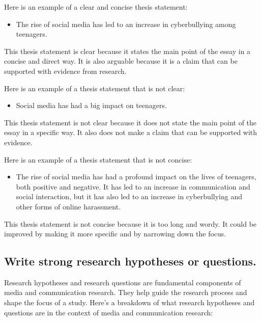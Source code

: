 \documentclass[
]{book}
\providecommand{\tightlist}{%
  \setlength{\itemsep}{0pt}\setlength{\parskip}{0pt}}
\begin{document}
Here is an example of a clear and concise thesis statement:

\begin{itemize}
\tightlist
\item
  The rise of social media has led to an increase in cyberbullying among teenagers.
\end{itemize}

This thesis statement is clear because it states the main point of the essay in a concise and direct way. It is also arguable because it is a claim that can be supported with evidence from research.

Here is an example of a thesis statement that is not clear:

\begin{itemize}
\tightlist
\item
  Social media has had a big impact on teenagers.
\end{itemize}

This thesis statement is not clear because it does not state the main point of the essay in a specific way. It also does not make a claim that can be supported with evidence.

Here is an example of a thesis statement that is not concise:

\begin{itemize}
\tightlist
\item
  The rise of social media has had a profound impact on the lives of teenagers, both positive and negative. It has led to an increase in communication and social interaction, but it has also led to an increase in cyberbullying and other forms of online harassment.
\end{itemize}

This thesis statement is not concise because it is too long and wordy. It could be improved by making it more specific and by narrowing down the focus.

\hypertarget{write-strong-research-hypotheses-or-questions.}{%
\subsection*{Write strong research hypotheses or questions.}\label{write-strong-research-hypotheses-or-questions.}}

Research hypotheses and research questions are fundamental components of media and communication research. They help guide the research process and shape the focus of a study. Here's a breakdown of what research hypotheses and questions are in the context of media and communication research:
\end{document}
